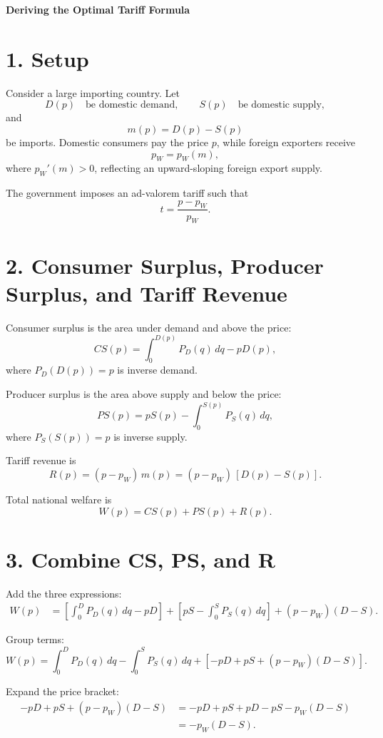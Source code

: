 \documentclass[11pt]{article}
\begin{document}
\begin{center}
    {\Large \textbf{Deriving the Optimal Tariff Formula}} \\[0.3cm]
\end{center}

\section*{1. Setup}

Consider a large importing country. Let
\[
D(p) \quad \text{be domestic demand}, \qquad 
S(p) \quad \text{be domestic supply},
\]
and
\[
m(p)=D(p)-S(p)
\]
be imports. Domestic consumers pay the price $p$, while foreign exporters receive
\[
p_W = p_W(m),
\]
where $p_W'(m)>0$, reflecting an upward-sloping foreign export supply.

The government imposes an ad-valorem tariff such that
\[
t=\frac{p-p_W}{p_W}.
\]

\section*{2. Consumer Surplus, Producer Surplus, and Tariff Revenue}

Consumer surplus is the area under demand and above the price:
\[
CS(p)
= \int_0^{D(p)} P_D(q)\, dq - pD(p),
\]
where $P_D(D(p))=p$ is inverse demand.

Producer surplus is the area above supply and below the price:
\[
PS(p)
= pS(p) - \int_0^{S(p)} P_S(q)\, dq,
\]
where $P_S(S(p))=p$ is inverse supply.

Tariff revenue is
\[
R(p)
= (p-p_W)\,m(p)
= (p-p_W)\,[D(p)-S(p)].
\]

Total national welfare is
\[
W(p)=CS(p)+PS(p)+R(p).
\]

\section*{3. Combine CS, PS, and R}

Add the three expressions:
\begin{align*}
W(p) &= \left[\int_0^{D} P_D(q)\,dq - pD\right]
     + \left[pS - \int_0^{S} P_S(q)\,dq\right]
     + (p-p_W)(D-S).
\end{align*}

Group terms:
\[
W(p)
= \int_0^{D}P_D(q)\,dq 
- \int_0^{S}P_S(q)\,dq
+ [-pD + pS + (p-p_W)(D-S)].
\]

Expand the price bracket:
\begin{align*}
-pD + pS + (p-p_W)(D-S)
&= -pD + pS + pD - pS - p_W(D-S) \\
&= -p_W(D-S).
\end{align*}
\end{document}

